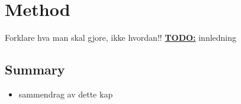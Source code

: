 \chapter{Method}
\label{chapter:method}
Forklare hva man skal gjore, ikke hvordan!!
\textbf{\underline{\LARGE TODO:}} innledning






\section{Summary}
\label{sect:method:summary}
\begin{itemize}
  \item sammendrag av dette kap
\end{itemize}